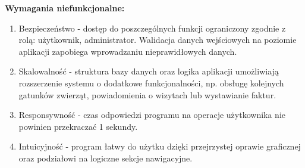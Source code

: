 \vspace{5pt}

\textbf{Wymagania niefunkcjonalne:}
\begin{enumerate}
\item Bezpieczeństwo - dostęp do poszczególnych funkcji ograniczony zgodnie z rolą: użytkownik, administrator. Walidacja danych wejściowych na poziomie aplikacji zapobiega wprowadzaniu nieprawidłowych danych.
\item Skalowalność - struktura bazy danych oraz logika aplikacji umożliwiają rozszerzenie systemu o dodatkowe funkcjonalności, np. obsługę kolejnych gatunków zwierząt, powiadomienia o wizytach lub wystawianie faktur.
\item Responsywność - czas odpowiedzi programu na operacje użytkownika nie powinien przekraczać 1 sekundy.
\item Intuicyjność - program łatwy do użytku dzięki przejrzystej oprawie graficznej oraz podziałowi na logiczne sekcje nawigacyjne.
\end{enumerate}